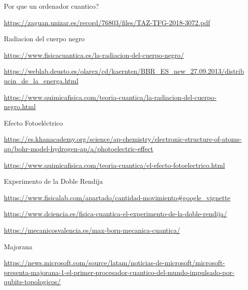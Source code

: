 \documentclass{article}
\numberwithin{equation}{section} %
\begin{document}
        Por que un ordenador cuantico?\par
        \url{https://zaguan.unizar.es/record/76803/files/TAZ-TFG-2018-3072.pdf}
        \vspace{2mm}

        Radiacion del cuerpo negro\par
        \url{https://www.fisicacuantica.es/la-radiacion-del-cuerpo-negro/}
        \vspace{2mm}

        \url{https://weblab.deusto.es/olarex/cd/kaernten/BBR_ES_new_27.09.2013/distribucin_de_la_energa.html}
        \vspace{2mm}

        \url{https://www.quimicafisica.com/teoria-cuantica/la-radiacion-del-cuerpo-negro.html}
        \vspace{2mm}

        Efecto Fotoeléctrico\par
        \url{https://es.khanacademy.org/science/ap-chemistry/electronic-structure-of-atoms-ap/bohr-model-hydrogen-ap/a/photoelectric-effect}
        \vspace{2mm}

        \url{https://www.quimicafisica.com/teoria-cuantica/el-efecto-fotoelectrico.html}
        \vspace{2mm}

        Experimento de la Doble Rendija\par
        \url{https://www.fisicalab.com/apartado/cantidad-movimiento#google_vignette}
        \vspace{2mm}

        \url{https://www.dciencia.es/fisica-cuantica-el-experimento-de-la-doble-rendija/}
        \vspace{2mm}

        \url{https://mecanicosvalencia.es/max-born-mecanica-cuantica/}
        \vspace{2mm}

        Majorana\par
        \url{https://news.microsoft.com/source/latam/noticias-de-microsoft/microsoft-presenta-majorana-1-el-primer-procesador-cuantico-del-mundo-impulsado-por-qubits-topologicos/}
        \vspace{2mm}
    
\end{document}
